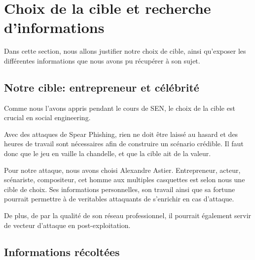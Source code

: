 \section{Choix de la cible et recherche d'informations}

Dans cette section, nous allons justifier notre choix de cible, ainsi qu'exposer les différentes informations
que nous avons pu récupérer à son sujet. 

\subsection{Notre cible: entrepreneur et célébrité}

Comme nous l'avons appris pendant le cours de SEN, le choix de la cible est crucial en social engineering.

Avec des attaques de Spear Phishing, rien ne doit être laissé au hasard et des heures de travail sont nécessaires afin de construire un scénario
crédible. Il faut donc que le jeu en vaille la chandelle, et que la cible ait de la valeur. 

Pour notre attaque, nous avons choisi Alexandre Astier. Entrepreneur, acteur, scénariste, compositeur, cet homme aux multiples casquettes est selon nous une cible de choix. 
Ses informations personnelles, son travail ainsi que sa fortune pourrait permettre à de veritables attaquants de s'enrichir en cas d'attaque.

De plus, de par la qualité de son réseau professionnel, il pourrait également servir de vecteur d'attaque en post-exploitation.

\subsection{Informations récoltées}

